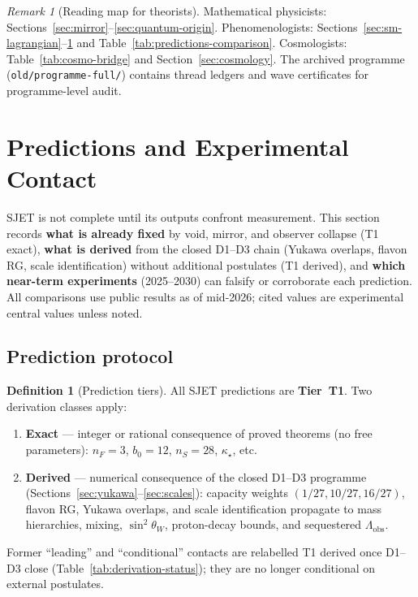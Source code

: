\documentclass[11pt]{article}
\theoremstyle{plain}
\theoremstyle{definition}
\newtheorem{definition}[theorem]{Definition}
\theoremstyle{remark}
\newtheorem{remark}[theorem]{Remark}
\numberwithin{equation}{section}
\begin{document}
\begin{remark}[Reading map for theorists]
Mathematical physicists: Sections~\ref{sec:mirror}--\ref{sec:quantum-origin}.
Phenomenologists: Sections~\ref{sec:sm-lagrangian}--\ref{sec:predictions} and
Table~\ref{tab:predictions-comparison}. Cosmologists:
Table~\ref{tab:cosmo-bridge} and Section~\ref{sec:cosmology}. The
archived programme (\texttt{old/programme-full/}) contains thread ledgers and
wave certificates for programme-level audit.
\end{remark}%
\section{Predictions and Experimental Contact}
\label{sec:predictions}

SJET is not complete until its outputs confront measurement. This section
records \textbf{what is already fixed} by void, mirror, and observer collapse
(T1 exact), \textbf{what is derived} from the closed D1--D3 chain (Yukawa
overlaps, flavon RG, scale identification) without additional postulates
(T1 derived), and \textbf{which near-term experiments} (2025--2030) can
falsify or corroborate each prediction. All comparisons use public results as
of mid-2026; cited values are experimental central values unless noted.

\subsection{Prediction protocol}
\label{sec:predictions:protocol}

\begin{definition}[Prediction tiers]\label{def:prediction-tiers}
All SJET predictions are \textbf{Tier~T1}. Two derivation classes apply:
\begin{enumerate}[label=\textbf{T1 (\alph*).},leftmargin=*]
  \item \textbf{Exact} --- integer or rational consequence of proved theorems
    (no free parameters): $n_F=3$, $b_0=12$, $n_S=28$, $\kappa_\star$, etc.
  \item \textbf{Derived} --- numerical consequence of the closed D1--D3
    programme (Sections~\ref{sec:yukawa}--\ref{sec:scales}): capacity weights
    $(1/27,10/27,16/27)$, flavon RG, Yukawa overlaps, and scale
    identification propagate to mass hierarchies, mixing, $\sin^2\theta_W$,
    proton-decay bounds, and sequestered $\Lambda_{\mathrm{obs}}$.
\end{enumerate}
Former ``leading'' and ``conditional'' contacts are relabelled T1 derived once
D1--D3 close (Table~\ref{tab:derivation-status}); they are no longer
conditional on external postulates.
\end{definition}
\end{document}
